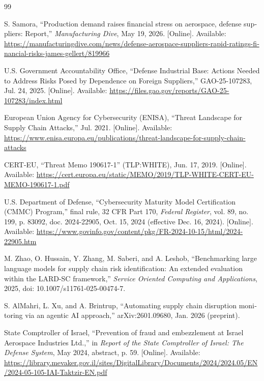 \begin{otherlanguage}{english}
\renewcommand{\bibname}{\foreignlanguage{hebrew}{מקורות}}
\raggedright
\small{}
\begin{thebibliography}{99}

S. Samora, ``Production demand raises financial stress on aerospace, defense suppliers: Report,'' \emph{Manufacturing Dive}, May 19, 2026. [Online]. Available: \url{https://manufacturingdive.com/news/defense-aerospace-suppliers-rapid-ratings-financial-risks-james-gellert/819966}

U.S. Government Accountability Office, ``Defense Industrial Base: Actions Needed to Address Risks Posed by Dependence on Foreign Suppliers,'' GAO-25-107283, Jul. 24, 2025. [Online]. Available: \url{https://files.gao.gov/reports/GAO-25-107283/index.html}

European Union Agency for Cybersecurity (ENISA), ``Threat Landscape for Supply Chain Attacks,'' Jul. 2021. [Online]. Available: \url{https://www.enisa.europa.eu/publications/threat-landscape-for-supply-chain-attacks}

CERT-EU, ``Threat Memo 190617-1'' (TLP:WHITE), Jun. 17, 2019. [Online]. Available: \url{https://cert.europa.eu/static/MEMO/2019/TLP-WHITE-CERT-EU-MEMO-190617-1.pdf}

U.S. Department of Defense, ``Cybersecurity Maturity Model Certification (CMMC) Program,'' final rule, 32 CFR Part 170, \emph{Federal Register}, vol. 89, no. 199, p. 83092, doc. 2024-22905, Oct. 15, 2024 (effective Dec. 16, 2024). [Online]. Available: \url{https://www.govinfo.gov/content/pkg/FR-2024-10-15/html/2024-22905.htm}

M. Zhao, O. Hussain, Y. Zhang, M. Saberi, and A. Leshob, ``Benchmarking large language models for supply chain risk identification: An extended evaluation within the LARD-SC framework,'' \emph{Service Oriented Computing and Applications}, 2025, doi: 10.1007/s11761-025-00474-7.

S. AlMahri, L. Xu, and A. Brintrup, ``Automating supply chain disruption monitoring via an agentic AI approach,'' arXiv:2601.09680, Jan. 2026 (preprint).

State Comptroller of Israel, ``Prevention of fraud and embezzlement at Israel Aerospace Industries Ltd.,'' in \emph{Report of the State Comptroller of Israel: The Defense System}, May 2024, abstract, p. 59. [Online]. Available: \url{https://library.mevaker.gov.il/sites/DigitalLibrary/Documents/2024/2024.05/EN/2024-05-105-IAI-Taktzir-EN.pdf}


\end{thebibliography}
\end{otherlanguage}
